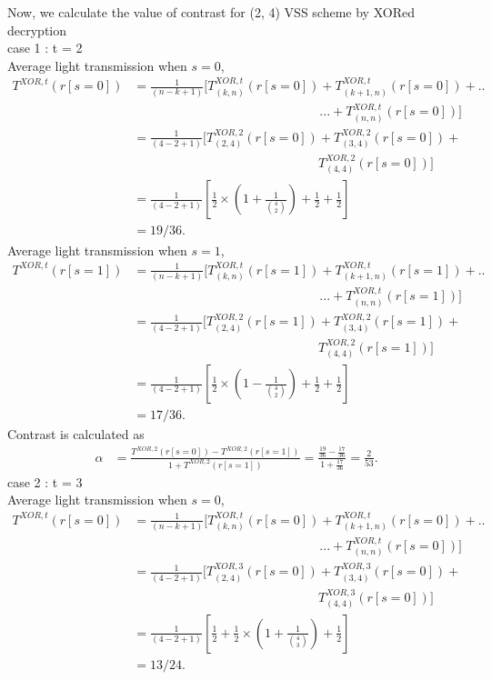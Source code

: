 Now, we calculate the value of contrast for (2, 4) VSS scheme by XORed decryption\\
case 1 : t = 2\\  
Average light transmission when $s=0$, 
\begin{align*}
T^{XOR,t}(r[s=0]) &= \frac{1}{(n-k+1)} [T^{XOR,t}_{(k,n)} (r[s=0]) + T^{XOR,t}_{(k+1,n)} (r[s=0]) + ..\\&\phantom{{}=\frac{1}{(n-k+1)} [T^{XOR,t}_{(k,n)} (r[s=0])}... + T^{XOR,t}_{(n,n)} (r[s=0])]\\
&=\frac{1}{(4-2+1)} [T^{XOR,2}_{(2,4)} (r[s=0]) + T^{XOR,2}_{(3,4)} (r[s=0]) +\\&\phantom{{}=\frac{1}{(4-2+1)} [T^{XOR,2}_{(2,4)} (r[s=0])} T^{XOR,2}_{(4,4)} (r[s=0])]\\
&=\frac{1}{(4-2+1)} [ \frac {1}{2} \times (1 + \frac {1}{\binom 42}) +\frac {1}{2}+ \frac {1}{2}]\\
&= 19/36.
\end{align*}
Average light transmission when $s=1$,
\begin{align*}
T^{XOR,t}(r[s=1]) &= \frac{1}{(n-k+1)} [T^{XOR,t}_{(k,n)} (r[s=1]) + T^{XOR,t}_{(k+1,n)} (r[s=1]) + ..\\&\phantom{{}=\frac{1}{(n-k+1)} [T^{XOR,t}_{(k,n)} (r[s=1])}... + T^{XOR,t}_{(n,n)} (r[s=1])]\\
&=\frac{1}{(4-2+1)} [T^{XOR,2}_{(2,4)} (r[s=1]) + T^{XOR,2}_{(3,4)} (r[s=1]) +\\&\phantom{{}=\frac{1}{(4-2+1)} [T^{XOR,2}_{(2,4)} (r[s=1])} T^{XOR,2}_{(4,4)} (r[s=1])]\\
&=\frac{1}{(4-2+1)} [ \frac {1}{2} \times (1 - \frac {1}{\binom 42}) +\frac {1}{2}+ \frac {1}{2}]\\
&= 17/36.
\end{align*}
Contrast is calculated as  
\begin{align*}
\alpha &= \frac{T^{XOR,2}(r[s=0]) - T^{XOR,2}(r[s=1])}{1 +T^{XOR,2}(r[s=1])} = \frac{\frac{19}{36}-\frac{17}{36}}{1+\frac{17}{36}}
= \frac{2}{53}.
\end{align*}
case 2 : t = 3\\
Average light transmission when $s=0$,
\begin{align*}
T^{XOR,t}(r[s=0]) &= \frac{1}{(n-k+1)} [T^{XOR,t}_{(k,n)} (r[s=0]) + T^{XOR,t}_{(k+1,n)} (r[s=0]) + ..\\&\phantom{{}=\frac{1}{(n-k+1)} [T^{XOR,t}_{(k,n)} (r[s=0])}... + T^{XOR,t}_{(n,n)} (r[s=0])]\\
&=\frac{1}{(4-2+1)} [T^{XOR,3}_{(2,4)} (r[s=0]) + T^{XOR,3}_{(3,4)} (r[s=0]) +\\&\phantom{{}=\frac{1}{(4-2+1)} [T^{XOR,3}_{(2,4)} (r[s=0])} T^{XOR,3}_{(4,4)} (r[s=0])]\\
&=\frac{1}{(4-2+1)} [\frac {1}{2}+\frac {1}{2} \times (1 + \frac {1}{\binom 43}) +\frac {1}{2}]\\
&= 13/24.
\end{align*}
